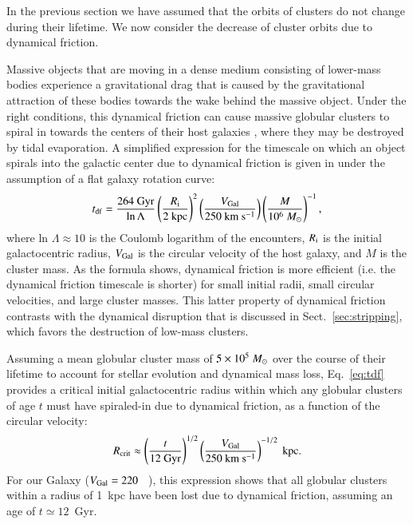 \documentclass{aa}
\begin{document}
In the previous section we have assumed that the orbits of clusters do not change during their lifetime.
We now consider the decrease of cluster orbits due to dynamical friction. 

Massive objects that are moving in a dense medium consisting of lower-mass bodies experience a gravitational drag that is caused by the gravitational attraction of these bodies towards the wake behind the massive object. Under the right conditions, this dynamical friction  can cause massive globular clusters to spiral in towards the centers of their host galaxies \citep[e.g.][]{chandrasekhar43,tremaine75,capriotti96,lotz01}, where they may be destroyed by tidal evaporation. A simplified expression for the timescale on which an object spirals into the galactic center due to dynamical friction is given in \citet{binney87} under the assumption of a flat galaxy rotation curve:
\begin{equation}
\label{eq:tdf}
t_{\rm df}=\frac{264~{\rm Gyr}}{\ln{\Lambda}}\left(\frac{R_{\rm i}}{2~{\rm kpc}}\right)^2\left(\frac{\mbox{$V_{\rm Gal}$}}{250~{\rm km}~{\rm s}^{-1}}\right)\left(\frac{M}{10^6~\mbox{$M_{\odot}$}}\right)^{-1} ,
\end{equation}
%
where ln $\Lambda\approx 10$ is the Coulomb logarithm of the encounters, $R_{\rm i}$ is the initial galactocentric radius, $\mbox{$V_{\rm Gal}$}$ is the circular velocity of the host galaxy, and $M$ is the cluster mass. As the formula shows, dynamical friction is more efficient (i.e. the dynamical friction timescale is shorter) for small initial radii, small circular velocities, and large cluster masses. This latter property of dynamical friction contrasts with the dynamical disruption that is discussed in Sect.~\ref{sec:stripping}, which favors the destruction of low-mass clusters. 


Assuming a mean globular cluster mass of $5\times10^5~\mbox{$M_{\odot}$}$ over the course of their lifetime to account for stellar evolution and dynamical mass loss, Eq.~\ref{eq:tdf} provides a critical initial galactocentric radius within which any globular clusters of age $t$ must have spiraled-in due to dynamical friction, as a function of the circular velocity:
%
\begin{equation}
\label{eq:rcrit}
R_{\rm crit}\approx \left(\frac{t}{12~{\rm Gyr}}\right)^{1/2}\left(\frac{\mbox{$V_{\rm Gal}$}}{250~{\rm km}~{\rm s}^{-1}}\right)^{-1/2}~{\rm kpc} .
\end{equation}
%
For our Galaxy ($\mbox{$V_{\rm Gal}$} =220$~ \kms), this expression shows that all globular clusters within a radius of 1~kpc have been lost due to dynamical friction, assuming an age of $t \simeq 12$~Gyr.
\end{document}
